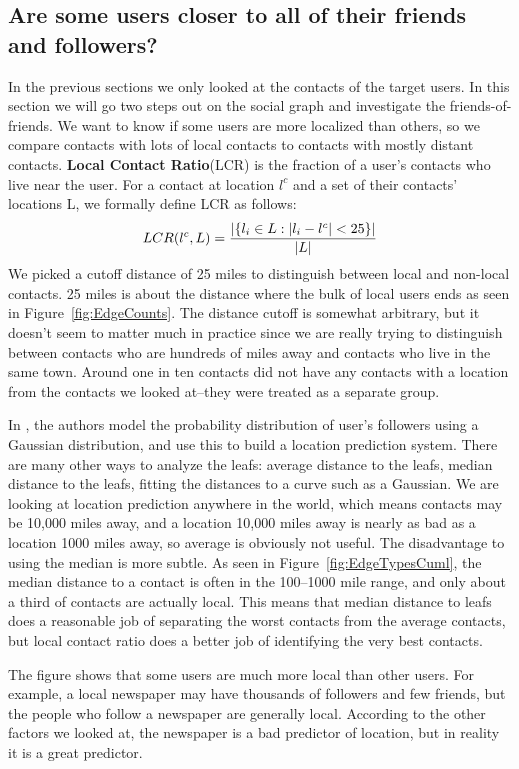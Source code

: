 \documentclass[letterpaper]{article}
\begin{document}
\subsection{Are some users closer to all of their friends and followers?}
\label{sec:closer}

In the previous sections we only looked at the contacts of the target
users.
%
In this section we will go two steps out on the social graph and
investigate the friends-of-friends.
%
We want to know if some users are more localized than others, so we compare
contacts with lots of local contacts to contacts with mostly distant contacts.
%
\textbf{Local Contact Ratio}(LCR) is the fraction of a user's contacts
who live near the user.
%
For a contact at location $l^c$ and a set of their contacts' locations L, we
formally define LCR as follows:
\[
    LCR(l^c,L) = { |\{ l_i \in L : |l_i-l^c|<25 \}|
                    \over |L| }
\]
%
We picked a cutoff distance of 25 miles to distinguish between local and non-local
contacts.
25 miles is about the distance where the bulk of local users ends as seen in
Figure~\ref{fig:EdgeCounts}.
%
The distance cutoff is somewhat arbitrary, but it doesn't seem to matter much
in practice since we are really trying to distinguish between contacts who are
hundreds of miles away and contacts who live in the same town.
%
Around one in ten contacts did not have any contacts with a location from the
contacts we looked at--they were treated as a separate group.

In \cite{li2012towards}, the authors model the probability distribution of
user's followers using a Gaussian distribution, and use this to build a
location prediction system.
%
There are many other ways to analyze the leafs: average distance to the leafs,
median distance to the leafs, fitting the distances to a curve such as a
Gaussian.
%
We are looking at location prediction anywhere in the world, which means
contacts may be 10,000 miles away, and a location 10,000 miles away is nearly
as bad as a location 1000 miles away, so average is obviously not useful.
%
The disadvantage to using the median is more subtle.
%
As seen in Figure~\ref{fig:EdgeTypesCuml}, the median distance to a contact is
often in the 100--1000 mile range, and only about a third of contacts are
actually local.
%
This means that median distance to leafs does a reasonable job of separating the
worst contacts from the average contacts, but local contact ratio does a better
job of identifying the very best contacts.

The figure shows that some users are much more local than other users.
For example, a local newspaper may have thousands of followers and few friends,
but the people who follow a newspaper are generally local.
According to the other factors we looked at, the newspaper is a bad predictor
of location, but in reality it is a great predictor.
\end{document}
